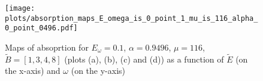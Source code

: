 \documentclass[40pt,letterpaper,physrev]{article}
\begin{document}
	\newpage	
	\begin{figure}[t]
	  \centering
	  \normalsize %
	  \texttt{[image: plots/absorption\_maps\_E\_omega\_is\_0\_point\_1\_mu\_is\_116\_alpha\_0\_point\_0496.pdf]}
	  \caption{Maps of absoprtion for $E_\omega=0.1$, $\alpha=0.9496$, $\mu=116$, $\tilde{B}=[1,3,4,8]$ 
	  (plots (a), (b), (c) and (d)) as a function of $\tilde{E}$ (on the x-axis) and $\omega$ (on the y-axis)}
	  \label{fig:absorption}	  
	\end{figure}	
\end{document}
